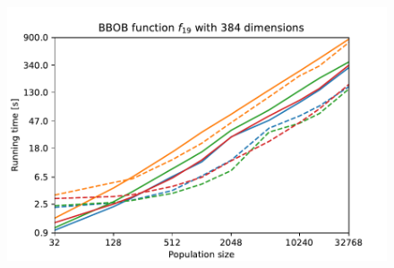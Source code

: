 \begin{figure}[ht!]
\begin{minipage}[t]{0.32\textwidth}
    \end{minipage}
    \hfill
    \begin{minipage}[t]{0.32\textwidth}
        \centering
        \includegraphics[width=\textwidth]{img/runs/time_es_mutation_fn19_384d.pdf}
    \end{minipage}


\end{figure}
